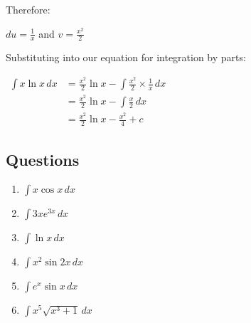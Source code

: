 \documentclass[../main.tex]{subfiles}
\begin{document}
Therefore:

\(du=\frac{1}{x}\) and \(v=\frac{x^2}{2}\)

Substituting into our equation for integration by parts:

$
\!
\begin{aligned}
    \int x\ln{x}\, dx
    &= \frac{x^2}{2}\ln{x}-\int \frac{x^2}{2}\times \frac{1}{x}\, dx\\
    &=\frac{x^2}{2}\ln{x}-\int \frac{x}{2}\, dx\\
    &=\frac{x^2}{2}\ln{x}-\frac{x^2}{4}+c
\end{aligned}
$

\pagebreak

\subsection*{Questions}
\label{Integration by parts}

\begin{enumerate}
    \item \(\int x\cos{x} \, dx\)

    \item \(\int 3xe^{3x}\, dx\)

    \item \(\int \ln{x}\, dx\)

    \item \(\int x^2 \sin{2x} \, dx\)

    \item \(\int e^x \sin{x}\, dx\)

    \item \(\int x^5 \sqrt{x^3+1}\, dx\)
    
    
\end{enumerate}


\pagebreak
\end{document}
